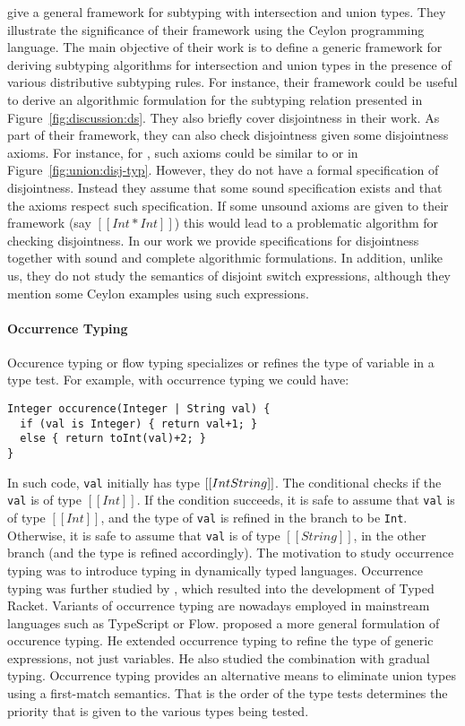 \citet{muehlboeck2018empowering} give a general framework for subtyping
with intersection and union types. They illustrate the significance of
their framework using the Ceylon programming language.
The main objective of their work is to define a generic framework for
deriving subtyping algorithms for
intersection and union types in the presence of various distributive subtyping rules.
For instance, their framework could be useful to derive an algorithmic
formulation for the subtyping relation presented in Figure~\ref{fig:discussion:ds}.
They also briefly cover disjointness in their work. As part of their framework, they
can also check disjointness given some disjointness axioms. For instance,
for \name, such axioms could be similar to  or 
in Figure~\ref{fig:union:disj-typ}.
However, they do not have a formal
specification of disjointness. Instead they assume that some sound specification
exists and that the axioms respect such specification.
If some unsound axioms are given to their framework (say $[[Int * Int]]$) this
would lead to a problematic algorithm for checking disjointness.
In our work we provide specifications for disjointness together
with sound and complete algorithmic formulations.
In addition, unlike us,
they do not study the semantics of disjoint switch expressions,
although they mention some Ceylon examples using such expressions.

\paragraph{Occurrence Typing}
Occurence typing or flow typing \cite{tobin2008design} specializes or refines
the type of variable in a type test. For example, with occurrence typing we
could have:

\begin{lstlisting}
Integer occurence(Integer | String val) {
  if (val is Integer) { return val+1; }
  else { return toInt(val)+2; }
}
\end{lstlisting}

\noindent In such code, \lstinline{val} initially has type $[[Int \/ String]]$.
The conditional checks if the \lstinline{val} is of type $[[Int]]$.
If the condition succeeds, it is safe to assume that \lstinline{val} is of type $[[Int]]$,
and the type of \lstinline{val} is refined in the branch to be \lstinline{Int}.
Otherwise, it is safe to assume that \lstinline{val} is of type $[[String]]$, in the
other branch (and the type is refined accordingly).
The motivation to study occurrence typing was to introduce typing in dynamically
typed languages.
Occurrence typing was further studied by \cite{tobin2010logical},
which resulted into the development of Typed Racket.
Variants of occurrence typing are nowadays employed in mainstream languages
such as TypeScript or Flow.
\cite{castagna2019revisiting} proposed a more general formulation of
occurence typing. He extended occurrence typing to refine the type of
generic expressions, not just variables. He also studied the combination
with gradual typing. Occurrence typing provides an alternative
means to eliminate union types using a first-match semantics. That is the
order of the type tests determines the priority that is given to the various
types being tested.

